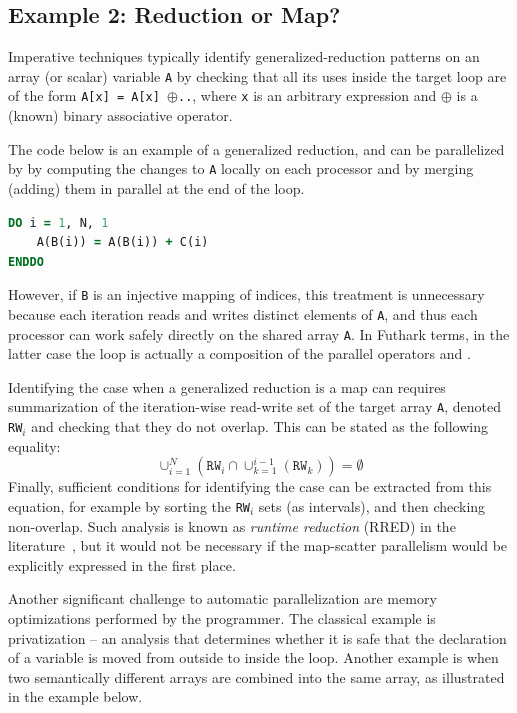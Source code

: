\subsection{Example 2: Reduction or Map?}
\label{subsec:eg2}

Imperative techniques typically identify generalized-reduction
patterns on an array (or scalar) variable \texttt{A} by checking that
all its uses inside the target loop are of the form \texttt{A[x] =
  A[x] $\oplus$..}, where \texttt{x} is an arbitrary expression and
$\oplus$ is a (known) binary associative operator.

The code below is an example of a generalized reduction, and can be
parallelized by by computing the changes to \texttt{A} locally on each
processor and by merging (adding) them in parallel at the end of the
loop.

\begin{lstlisting}[language=fortran]
DO i = 1, N, 1
    A(B(i)) = A(B(i)) + C(i)
ENDDO
\end{lstlisting}

However, if \texttt{B} is an injective mapping of indices, this
treatment is unnecessary because each iteration reads and writes
distinct elements of \texttt{A}, and thus each processor can work
safely directly on the shared array \texttt{A}.  In Futhark terms, in
the latter case the loop is actually a composition of the parallel
operators  and .

Identifying the case when a generalized reduction is a map can
requires summarization of the iteration-wise read-write set of the
target array \texttt{A}, denoted \texttt{RW$_i$} and checking that
they do not overlap.  This can be stated as the following equality:
\[
  \cup_{i=1}^{N}(\texttt{RW}_i\cap\cup_{k=1}^{i-1}(\texttt{RW}_k))=\emptyset
\]
Finally, sufficient conditions for identifying the  case can
be extracted from this equation, for example by sorting the
\texttt{RW$_i$} sets (as intervals), and then checking
non-overlap. Such analysis is known as \textit{runtime reduction}
(RRED) in the literature~\cite{CosPLDI}, but it would not be necessary
if the map-scatter parallelism would be explicitly expressed in the
first place.

Another significant challenge to automatic parallelization are
memory optimizations performed by the programmer. The classical
example is privatization -- an analysis that determines whether
it is safe that the declaration of a variable is moved from outside
to inside the loop.   Another example is when two semantically
different arrays are combined into the same array, as 
illustrated in the example below. 

